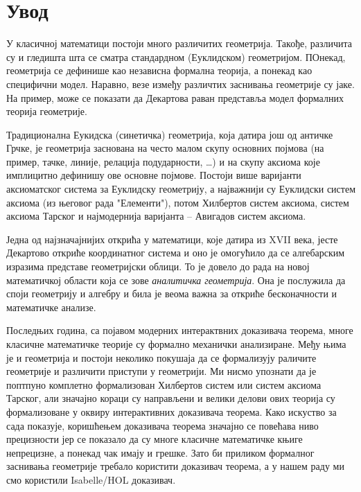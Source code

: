 \documentclass[a4paper, 12pt]{article}
\begin{document}
\section{Увод}
У класичној математици постоји много различитих геометрија. Такође,
различита су и гледишта шта се сматра стандардном (Еуклидском)
геометријом. ПОнекад, геометрија се дефинише као независна формална
теорија, а понекад као специфични модел. Наравно, везе између
различтих заснивања геометрије су јаке. На пример, може се показати да
Декартова раван представља модел формалних теорија геометрије.

Традиционална Еукидска (синетичка) геометрија, која датира још од
античке Грчке, је геометрија заснована на често малом скупу основних
појмова (на пример, тачке, линије, релација подударности, \ldots) и на
скупу аксиома које имплицитно дефинишу ове основне појмове.  Постоји
више варијанти аксиоматског система за Еуклидску геометрију, а
најважнији су Еуклидски систем аксиома (из његовог рада "Елементи"),
потом Хилбертов систем аксиома\cite{hilbert}, систем аксиома
Тарског\cite{tarski} и најмодернија варијанта -- Авигадов систем
аксиома\cite{avigad}.

Једна од најзначајнијих открића у математици, које датира из {\lat
  XVII} века, јесте Декартово откриће координатног система и оно је
омогућило да се алгебарским изразима представе геометријски облици. То
је довело до рада на новој математичкој области која се зове
\emph{аналитичка геометрија}. Она је послужила да споји геометрију и
алгебру и била је веома важна за откриће бесконачности и математичке
анализе.

Последњих година, са појавом модерних интерактвних доказивача теорема,
многе класичне математичке теорије су формално механички
анализиране. Међу њима је и геометрија и постоји неколико покушаја да
се формализују раличите геометрије и различити приступи у
геометрији. Ми нисмо упознати да је поптпуно комплетно формализован
Хилбертов систем\cite{hilbert} или систем аксиома
Тарског\cite{tarski}, али значајно кораци су направљени и велики
делови ових теорија су формализоване у оквиру интерактивних доказивача
теорема\cite{hilbert-isabelle,narboux,projective-coq1}.  Како искуство
за сада показује, коришћењем доказивача теорема значајно се повећава
ниво прецизности јер се показало да су многе класичне математичке
књиге непрецизне, а понекад чак имају и грешке. Зато би приликом
формалног заснивања геометрије требало користити доказивач теорема, а
у нашем раду ми смо користили {\lat Isabelle/HOL}\cite{Isabelle}
доказивач.
\end{document}
